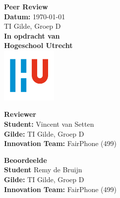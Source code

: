 \documentclass[a4paper]{report}
\begin{document}
\begin{titlepage}
  \begin{center}
      \vspace*{.9cm}
      \Huge
      \textbf{ Peer Review }\\
      \vspace{0.2cm}
      \small \textbf{Datum:} \today \\
      \small TI Gilde, Groep D \\

      \vspace{2cm}
      \normalsize
      \vspace{1cm}
      \Large
      \textbf{In opdracht van}\\
      \large
      \textbf{Hogeschool Utrecht} \\
      \includegraphics[width=0.2\textwidth]{Images/logouni.png}
      \vfill

      \begin{minipage}{0.45\textwidth}
        \large
        \textbf{Reviewer}\\
        \normalsize
        \textbf{Student:} Vincent van Setten \\
        \textbf{Gilde:} TI Gilde, Groep D\\
        \textbf{Innovation Team:} FairPhone (499) \\
        \vspace{2cm}
      \end{minipage}
      \hfill
      \begin{minipage}{0.45\textwidth}
        \large
        \textbf{Beoordeelde}\\
        \normalsize
        \textbf{Student} Remy de Bruijn  \\
        \textbf{Gilde:} TI Gilde, Groep D\\
        \textbf{Innovation Team:} FairPhone (499) \\
        \vspace{2cm}
      \end{minipage}
    \end{center}
\end{titlepage}


\tableofcontents
\end{document}
